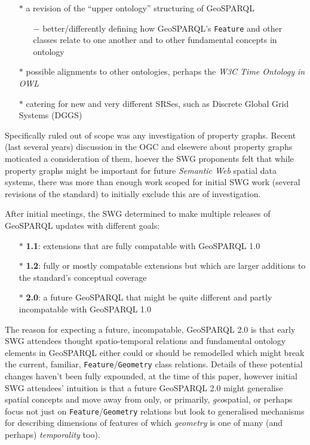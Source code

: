 \documentclass[runningheads]{llncs}
\begin{document}
\begin{itemize}
    \item[$\ast$] a revision of the ``upper  ontology'' structuring of GeoSPARQL
    \begin{itemize}
        \item[$-$] better/differently defining how GeoSPARQL's \texttt{Feature} and other classes relate to one another and to other fundamental concepts in ontology
    \end{itemize} 
    \item[$\ast$] possible alignments to other ontologies, perhaps the \textit{W3C Time Ontology in OWL}\cite{simon_cox_time_2017}
    \item[$\ast$] catering for new and very different SRSes, such as Discrete Global Grid Systems (DGGS) 
\end{itemize}

Specifically ruled out of scope was any investigation of property graphs. Recent (last several years) discussion in the OGC and 
elsewere about property graphs moticated a consideration of them, hoever the SWG proponents felt that while property graphs might 
be important for future \textit{Semantic Web} spatial data systems, there was more than enough work scoped for initial SWG work
(several revisions of the standard) to initially exclude this are of investigation.

After initial meetings, the SWG determined to make multiple releases of GeoSPARQL updates with different goals:

\begin{itemize}
    \item[$\ast$] \textbf{1.1}: extensions that are fully compatable with GeoSPARQL 1.0
    \item[$\ast$] \textbf{1.2}: fully or mostly compatable extensions but which are larger additions to the standard's conceptual coverage
    \item[$\ast$] \textbf{2.0}: a future GeoSPARQL that might be quite different and partly incompatable with GeoSPARQL 1.0
\end{itemize} 

The reason for expecting a future, incompatable, GeoSPARQL 2.0 is that early SWG attendees thought spatio-temporal relations
and fundamental ontology elements in GeoSPARQL either could or should be remodelled which might break the current, familiar, 
\texttt{Feature}/\texttt{Geometry} class relations. Details of these potential changes haven't been fully expounded, at the 
time of this paper, however initial SWG attendees' intuition is that a future GeoSPARQL 2.0 might generalise spatial concepts and
move away from only, or primarily, \textit{geo}spatial, or perhaps focus not just on \texttt{Feature}/\texttt{Geometry} relations
but look to generalised mechanisms for describing dimensions of features of which \textit{geometry} is one of many (and perhaps)
\textit{temporality} too).
\end{document}
